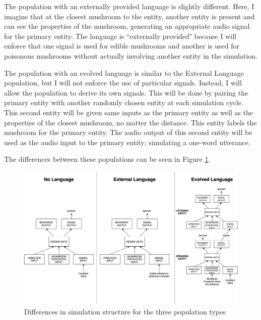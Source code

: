\documentclass[12pt,a4paper,twoside,openright]{report}
\begin{document}
The population with an externally provided language is slightly different. Here, I imagine that at the closest mushroom to the entity, another entity is present and can see the properties of the mushroom, generating an appropriate audio signal for the primary entity. The language is ``externally provided" because I will enforce that one signal is used for edible mushrooms and another is used for poisonous mushrooms without actually involving another entity in the simulation. 

The population with an evolved language is similar to the External Language population, but I will not enforce the use of particular signals. Instead, I will allow the population to derive its own signals. This will be done by pairing the primary entity with another randomly chosen entity at each simulation cycle. This second entity will be given same inputs as the primary entity as well as the properties of the closest mushroom, no matter the distance. This entity labels the mushroom for the primary entity. The audio output of this second entity will be used as the audio input to the primary entity; simulating a one-word utterance.

The differences between these populations can be seen in Figure \ref{fig:populations}.

\begin{figure}[t]
  \centering
  \includegraphics[width=.9\linewidth]{figs/populations}
  \caption{Differences in simulation structure for the three population types}
  \label{fig:populations}
\end{figure}
\end{document}
